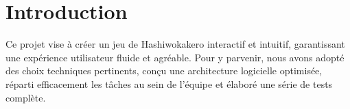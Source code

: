 \section{Introduction}

Ce projet vise à créer un jeu de Hashiwokakero interactif et intuitif, garantissant une expérience utilisateur fluide et agréable. Pour y parvenir, nous avons adopté des choix techniques pertinents, conçu une architecture logicielle optimisée, réparti efficacement les tâches au sein de l'équipe et élaboré une série de tests complète.